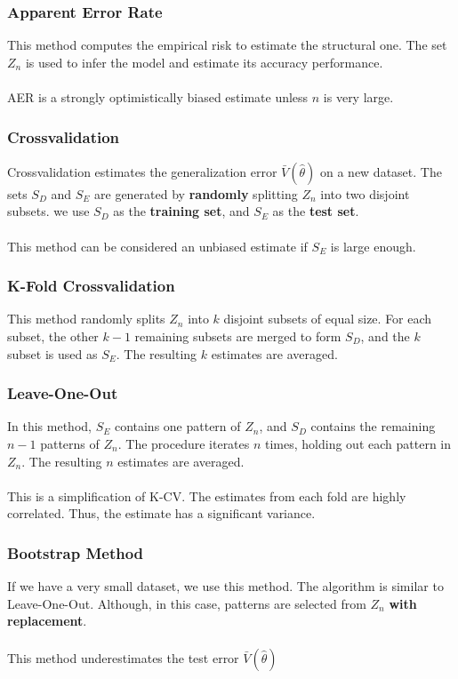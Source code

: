 \documentclass{article}
\begin{document}
\subsubsection{Apparent Error Rate}
This method computes the empirical risk to estimate the structural one. The set $Z_n$ is used to infer the model and estimate its accuracy performance. \\ \\
AER is a strongly optimistically biased estimate unless $n$ is very large.

\subsubsection{Crossvalidation}
Crossvalidation estimates the generalization error $\bar V(\hat\theta)$ on a new dataset. The sets $S_D$ and $S_E$ are generated by \textbf{randomly} splitting $Z_n$ into two disjoint subsets. we use $S_D$ as the \textbf{training set}, and $S_E$ as the \textbf{test set}. \\ \\
This method can be considered an unbiased estimate if $S_E$ is large enough.

\subsubsection{K-Fold Crossvalidation}
This method randomly splits $Z_n$ into $k$ disjoint subsets of equal size. For each subset, the other $k-1$ remaining subsets are merged to form $S_D$, and the $k$ subset is used as $S_E$. The resulting $k$ estimates are averaged.

\subsubsection{Leave-One-Out}
In this method, $S_E$ contains one pattern of $Z_n$, and $S_D$ contains the remaining $n - 1$ patterns of $Z_n$. The procedure iterates $n$ times, holding out each pattern in $Z_n$. The resulting $n$ estimates are averaged. \\ \\
This is a simplification of K-CV. The estimates from each fold are highly correlated. Thus, the estimate has a significant variance.

\subsubsection{Bootstrap Method}
If we have a very small dataset, we use this method. The algorithm is similar to Leave-One-Out. Although, in this case, patterns are selected from $Z_n$ \textbf{with replacement}. \\ \\
This method underestimates the test error $\bar V(\hat\theta)$
\end{document}
